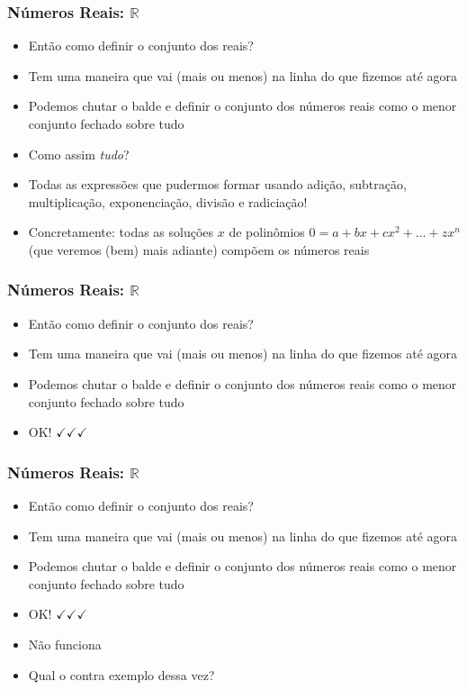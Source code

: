 \documentclass[usenames,dvipsnames,svgnames]{beamer}
\begin{document}
\begin{frame}
	
	\frametitle{Números Reais: $\mathbb{R}$}

	\begin{itemize}
		\item Então como definir o conjunto dos reais?
		\item Tem uma maneira que vai (mais ou menos) na linha do que fizemos até agora
		\item Podemos chutar o balde e definir o conjunto dos números reais como o menor conjunto fechado sobre {\color{red}tudo}
		\item Como assim \emph{tudo}?
		\item Todas as expressões que pudermos formar usando adição, subtração, multiplicação, exponenciação, divisão e radiciação!
		\item Concretamente: todas as soluções $x$ de polinômios $0 = a + bx + cx^2 + \dots + zx^n$ (que veremos (bem) mais adiante) compõem os números reais
	\end{itemize}

\end{frame}

\begin{frame}
	
	\frametitle{Números Reais: $\mathbb{R}$}

	\begin{itemize}
		\item Então como definir o conjunto dos reais?
		\item Tem uma maneira que vai (mais ou menos) na linha do que fizemos até agora
		\item Podemos chutar o balde e definir o conjunto dos números reais como o menor conjunto fechado sobre tudo
		\item {\color{ForestGreen}OK! $\checkmark\checkmark\checkmark$}
	\end{itemize}

\end{frame}

\begin{frame}
	
	\frametitle{Números Reais: $\mathbb{R}$}

	\begin{itemize}
		\item Então como definir o conjunto dos reais?
		\item Tem uma maneira que vai (mais ou menos) na linha do que fizemos até agora
		\item Podemos chutar o balde e definir o conjunto dos números reais como o menor conjunto fechado sobre tudo
		\item {\color{ForestGreen}OK! $\checkmark\checkmark\checkmark$}
		\item {\color{red} Não funciona}
		\item Qual o contra exemplo dessa vez?
	\end{itemize}

\end{frame}
\end{document}
